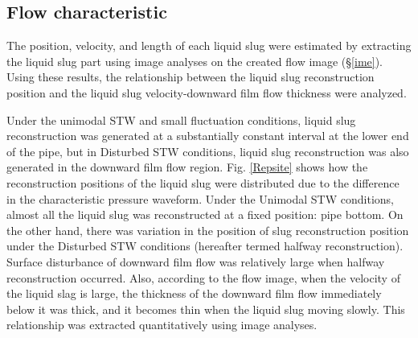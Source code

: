 \documentclass[aps,pre,preprint,groupedaddress,showkeys]{revtex4-2}
\begin{document}
\subsection{Flow characteristic}
The position, velocity, and length of each liquid slug were estimated by extracting the liquid slug part using image analyses on the created flow image (\S \ref{ime}).
Using these results, the relationship between the liquid slug reconstruction position and the liquid slug velocity-downward film flow thickness were analyzed.

Under the unimodal STW and small fluctuation conditions, liquid slug reconstruction was generated at a substantially constant interval at the lower end of the pipe, but in Disturbed STW conditions, liquid slug reconstruction was also generated in the downward film flow region.
Fig. \ref{Repsite} shows how the reconstruction positions of the liquid slug were distributed due to the difference in the characteristic pressure waveform.
Under the Unimodal STW conditions, almost all the liquid slug was reconstructed at a fixed position: pipe bottom.
On the other hand, there was variation in the position of slug reconstruction position under the Disturbed STW conditions (hereafter termed halfway reconstruction).
Surface disturbance of downward film flow was relatively large when halfway reconstruction occurred.
Also, according to the flow image, when the velocity of the liquid slag is large, the thickness of the downward film flow immediately below it was thick, and it becomes thin when the liquid slug moving slowly.
This relationship was extracted quantitatively using image analyses.
\end{document}
